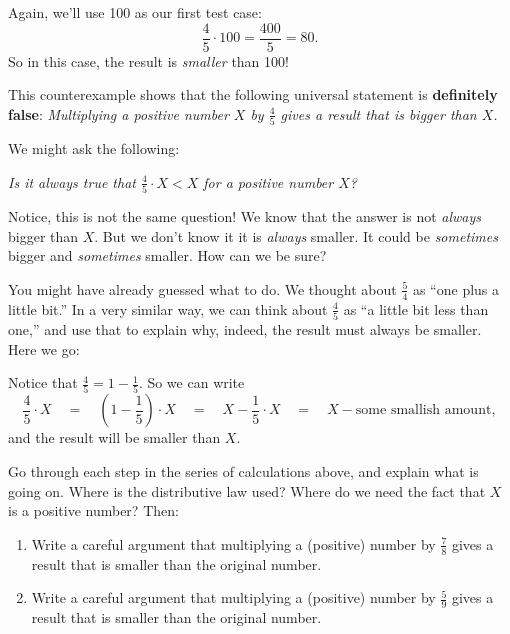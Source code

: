 \begin{example}
  Again, we'll use 100 as our first test case:
\[
\frac 4 5 \cdot 100 = \frac{400} 5 = 80.
\]
So in this case, the result is \emph{smaller} than 100!  
\end{example}

This counterexample shows that the following  universal statement is {\bf definitely false}:
\emph{Multiplying a positive number $X$ by $\frac 4 5$ gives a result that is bigger than $X$.}


We might ask the following:
\begin{center}
\emph{Is it always true that  $\frac 4 5 \cdot X < X$ for a positive number $X$?}
\end{center}

Notice, this is not the same question!  We know that the answer is not \emph{always} bigger than $X$.  But we don't know it it is \emph{always} smaller.  It could be \emph{sometimes} bigger and \emph{sometimes} smaller.  How can we be sure?

You might have already guessed what to do.  We thought about $\frac 5 4$ as ``one plus a little bit.''  In a very similar way, we can think about $\frac 4 5$ as ``a little bit less than one,'' and use that to explain why, indeed, the result must always be smaller.  Here we go:

Notice that $\frac 4 5 = 1 - \frac 1 5$.  So we can write
\[
\frac 4 5 \cdot X 
\quad
=
\quad
\left( 1 - \frac 1 5\right) \cdot X
\quad 
=
\quad
X - \frac 1 5\cdot X
\quad
=
\quad
X - \text{some smallish amount},
\]
and the result will be smaller than $X$.

\begin{thinkpair*}
Go through each step in the series of calculations above, and explain what is going on.  Where is the distributive law used?  Where do we need the fact that $X$ is a positive number?  Then:
\begin{enumerate}
\item
Write a careful argument that multiplying a (positive) number by $\frac 7 8$ gives a result that is smaller than the original number.\\
\item
 Write a careful argument that multiplying a (positive) number by $\frac 5 9$ gives a result that is smaller than the original number.\\
 \end{enumerate}

\end{thinkpair*}

